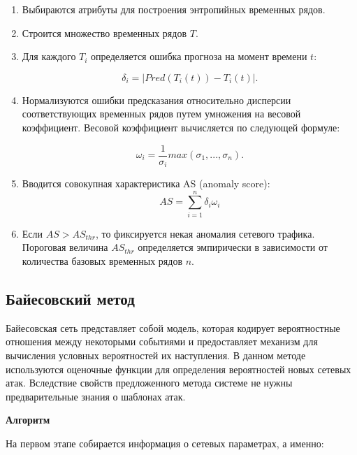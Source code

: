 \begin{enumerate}
    \item Выбираются атрибуты для построения энтропийных временных рядов.
    \item Строится множество временных рядов $T$.
    \item Для каждого $T_i$ определяется ошибка прогноза на момент времени $t$: 
    
    \begin{equation}
        \delta_i = | Pred(T_i(t)) - T_i(t) |.
    \end{equation}
    
    \item Нормализуются  ошибки предсказания относительно дисперсии соответствующих временных рядов путем умножения на весовой коэффициент. Весовой коэффициент вычисляется по следующей формуле:
    
    \begin{equation}
        \omega_i = \frac{1}{\sigma_i} max(\sigma_1,...,\sigma_n).
    \end{equation}

    \item Вводится совокупная характеристика AS (anomaly score):
    \begin{equation}
        AS = \sum_{i = 1}^{n} \delta_i \omega_i
    \end{equation}

    \item Если $AS > AS_{thr}$, то фиксируется некая аномалия сетевого трафика. Пороговая величина $AS_{thr}$ определяется эмпирически в зависимости от количества базовых временных рядов $n$.
\end{enumerate}


\subsection*{Байесовский метод}

Байесовская сеть \cite{ten} представляет собой модель, которая кодирует вероятностные отношения между некоторыми событиями и предоставляет механизм для вычисления условных вероятностей их наступления. В данном методе используются оценочные функции для определения вероятностей новых сетевых атак. Вследствие свойств предложенного метода системе не нужны предварительные знания о шаблонах атак.

\textbf{Алгоритм}

На первом этапе собирается информация о сетевых параметрах, а именно: 

